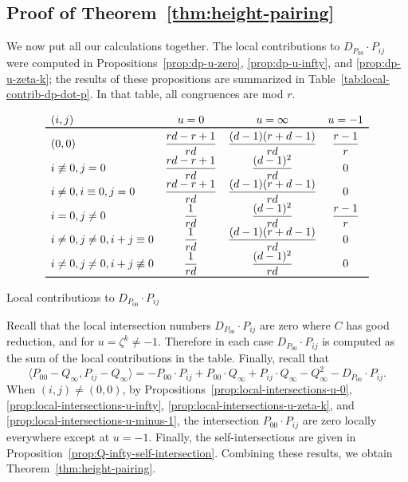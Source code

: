 \documentclass[reqno]{amsart}
\theoremstyle{definition}
\theoremstyle{remark}
\begin{document}
\subsection{Proof of Theorem~\ref{thm:height-pairing}}
\label{sec:proof-theor-refthm:h}

We now put all our calculations together. The local contributions to $D_{P_{00}} \cdot P_{ij}$ were computed in Propositions~\ref{prop:dp-u-zero}, \ref{prop:dp-u-infty}, and \ref{prop:dp-u-zeta-k}; the results of these propositions are summarized in Table~\ref{tab:local-contrib-dp-dot-p}. In that table, all congruences are mod $r$.

\renewcommand\arraystretch{2}
\begin{table}[htb]
  \centering
  \[
  \begin{array}[c]{lccc}
    (i,j) & u = 0 & u = \infty & u = -1 \\ \toprule
    (0,0) & \dfrac{rd-r+1}{rd} & \dfrac{(d-1)(r+d-1)}{rd} & \dfrac{r-1}{r} \\
    i \not\equiv 0, j = 0 & \dfrac{rd - r + 1}{rd} & \dfrac{(d-1)^2}{rd} & 0 \\
    i \neq 0, i \equiv 0, j = 0 & \dfrac{rd - r + 1}{rd} & \dfrac{(d-1)(r+d-1)}{rd} & 0 \\
    i = 0, j \neq 0 & \dfrac{1}{rd} & \dfrac{(d-1)^2}{rd} & \dfrac{r-1}{r} \\
    i \neq 0, j \neq 0, i + j \equiv 0 & \dfrac{1}{rd} & \dfrac{(d-1)(r+d-1)}{rd} & 0 \\
    i \neq 0, j \neq 0, i + j \not\equiv 0 & \dfrac{1}{rd} & \dfrac{(d-1)^2}{rd} & 0 \\
    \bottomrule
  \end{array}
  \]
  \caption{Local contributions to $D_{P_{00}} \cdot P_{ij}$}
  \label{tab:local-contrib-dp-dot-p}
\end{table}
\renewcommand\arraystretch{1}

Recall that the local intersection numbers $D_{P_{00}} \cdot P_{ij}$ are zero where $C$ has good reduction, and for $u = \zeta^k \neq -1$. Therefore in each case $D_{P_{00}} \cdot P_{ij}$ is computed as the sum of the local contributions in the table. Finally, recall that
\[
\langle {P_{00}} - Q_\infty, P_{ij} - Q_\infty\rangle = -{P_{00}} \cdot P_{ij} + {P_{00}} \cdot Q_\infty + P_{ij} \cdot Q_\infty - Q_\infty^2 - D_{P_{00}} \cdot P_{ij}.
\]
When $(i,j) \neq (0,0)$, by Propositions~\ref{prop:local-intersections-u-0}, \ref{prop:local-intersections-u-infty}, \ref{prop:local-intersections-u-zeta-k}, and \ref{prop:local-intersections-u-minus-1}, the intersection $P_{00} \cdot P_{ij}$ are zero locally everywhere except at $u = -1$. Finally, the self-intersections are given in Proposition~\ref{prop:Q-infty-self-intersection}. Combining these results, we obtain Theorem~\ref{thm:height-pairing}.
\end{document}
